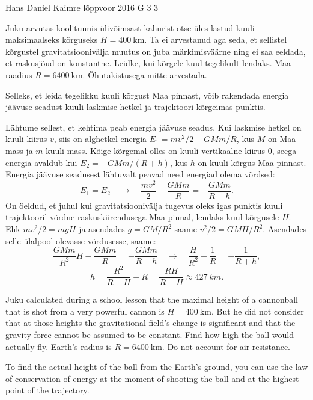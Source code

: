 {Hans Daniel Kaimre} %
{lõppvoor} %
{2016} %
{G 3} %
{3} %
{
\ifStatement
Juku arvutas koolitunnis ülivõimsast kahurist otse üles lastud kuuli maksimaalseks kõrguseks $H=\SI{400}{\km}$. Ta ei arvestanud aga seda, et sellistel kõrgustel gravitatsioonivälja muutus on juba märkimisväärne ning ei saa eeldada, et raskusjõud on konstantne. Leidke, kui kõrgele kuul tegelikult lendaks. Maa raadius $R=\SI{6400}{\km}$. Õhutakistusega mitte arvestada.
\fi


\ifHint
Selleks, et leida tegelikku kuuli kõrgust Maa pinnast, võib rakendada energia jäävuse seadust kuuli laskmise hetkel ja trajektoori kõrgeimas punktis.
\fi


\ifSolution
Lähtume sellest, et kehtima peab energia jäävuse seadus. Kui laskmise hetkel on kuuli kiirus $v$, siis on alghetkel energia $E_1 = mv^2/2 - GMm/R$, kus $M$ on Maa mass ja $m$ kuuli mass. Kõige kõrgemal olles on kuuli vertikaalne kiirus \num{0}, seega energia avaldub kui $E_2 = -GMm/(R+h)$, kus $h$ on kuuli kõrgus Maa pinnast. Energia jäävuse seadusest lähtuvalt peavad need energiad olema võrdsed:$$E_1 = E_2 \quad\rightarrow\quad \frac{mv^2}{2} - \frac{GMm}{R} = -\frac{GMm}{R+h}.$$
On öeldud, et juhul kui gravitatsioonivälja tugevus oleks igas punktis kuuli trajektooril võrdne raskuskiirendusega Maa pinnal, lendaks kuul kõrgusele $H$. Ehk $mv^2/2=mgH$ ja asendades $g=GM/R^2$ saame $v^2/2=GMH/R^2$. Asendades selle ülalpool olevasse võrdusesse, saame:
$$\frac{GMm}{R^2}H - \frac{GMm}{R} = -\frac{GMm}{R+h} \quad\rightarrow\quad \frac{H}{R^2}-\frac{1}{R} = - \frac{1}{R+h},$$
$$h=\frac{R^2}{R-H} - R = \frac{RH}{R-H} \approx \SI{427}{km}.$$
\fi


\ifEngStatement
Juku calculated during a school lesson that the maximal height of a cannonball that is shot from a very powerful cannon is $H=\SI{400}{\km}$. But he did not consider that at those heights the gravitational field’s change is significant and that the gravity force cannot be assumed to be constant. Find how high the ball would actually fly. Earth’s radius is $R=\SI{6400}{\km}$. Do not account for air resistance.
\fi


\ifEngHint
To find the actual height of the ball from the Earth’s ground, you can use the law of conservation of energy at the moment of shooting the ball and at the highest point of the trajectory.
\fi


}
